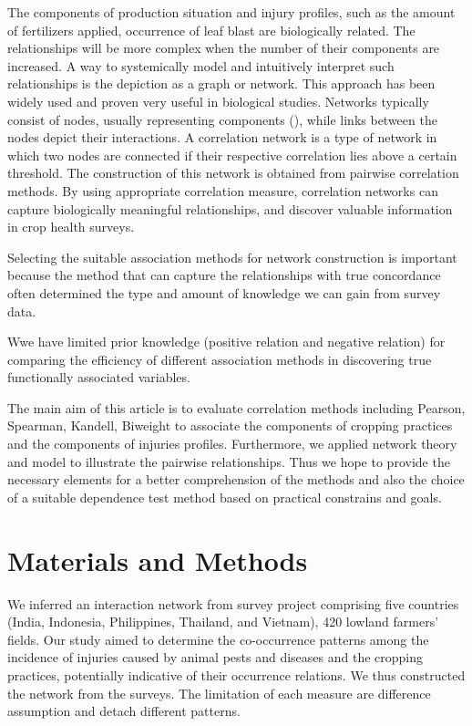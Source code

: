 \documentclass[a4paper]{article}
\begin{document}
The components of production situation and injury profiles, such as the amount of fertilizers applied, occurrence of leaf blast are biologically related. The relationships will be more complex when the number of their components are increased. A way to systemically model and intuitively interpret such relationships is the depiction as a graph or network. This approach has been widely used and proven very useful in biological studies. Networks typically consist of nodes, usually representing components (), while links between the nodes depict their interactions. A correlation network is a type of network in which two nodes are connected if their respective correlation lies above a certain threshold. The construction of this network is obtained from pairwise correlation methods. By using appropriate correlation measure, correlation networks can capture biologically meaningful relationships, and discover valuable information in crop health surveys.


Selecting the suitable association methods for network construction is important because the method that can capture the relationships with true concordance often determined the type and amount of knowledge we can gain from survey data.

Wwe have limited prior knowledge (positive relation and negative relation) for comparing the efficiency of different association methods in discovering true functionally associated variables.

The main aim of this article is to evaluate correlation methods including Pearson, Spearman, Kandell, Biweight to associate the components of cropping practices and the components of injuries profiles. Furthermore, we applied network theory and model to illustrate the pairwise relationships. Thus we hope to provide the necessary elements for a better comprehension of the methods and also the choice of a suitable dependence test method based on practical constrains and goals.

\section*{Materials and Methods}

We inferred an interaction network from survey project comprising five countries (India, Indonesia, Philippines, Thailand, and Vietnam), 420 lowland farmers' fields. Our study aimed to determine the co-occurrence patterns among the incidence of injuries caused by animal pests and diseases and the cropping practices, potentially indicative of their occurrence relations. We thus constructed the network from the surveys. The limitation of each measure are difference assumption and detach different patterns.
\end{document}
